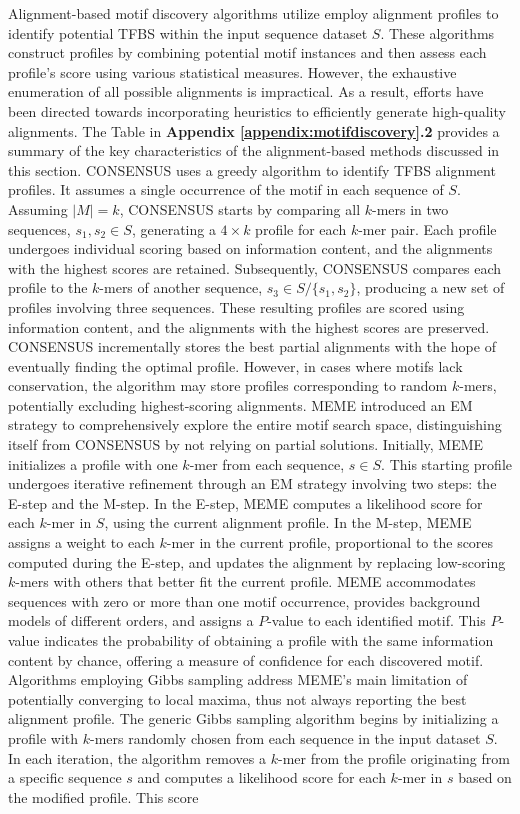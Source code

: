 \documentclass[a4paper, titlepage, openright]{book}
\begin{document}
Alignment-based motif discovery algorithms utilize employ alignment profiles to identify potential TFBS within the input sequence dataset $S$. These algorithms construct profiles by combining potential motif instances and then assess each profile's score using various statistical measures. However, the exhaustive enumeration of all possible alignments is impractical. As a result, efforts have been directed towards incorporating heuristics to efficiently generate high-quality alignments. The Table in \textbf{Appendix \ref{appendix:motifdiscovery}.2} provides a summary of the key characteristics of the alignment-based methods discussed in this section. CONSENSUS \citep{hertz1999identifying} uses a greedy algorithm to identify TFBS alignment profiles. It assumes a single occurrence of the motif in each sequence of $S$. Assuming $|M|=k$, CONSENSUS starts by comparing all $k$-mers in two sequences, $s_{1}, s_{2} \in S$, generating a $4 \times k$ profile for each $k$-mer pair. Each profile undergoes individual scoring based on information content, and the alignments with the highest scores are retained. Subsequently, CONSENSUS compares each profile to the $k$-mers of another sequence, $s_{3} \in S/\{s_{1},s_{2}\}$, producing a new set of profiles involving three sequences. These resulting profiles are scored using information content, and the alignments with the highest scores are preserved. CONSENSUS incrementally stores the best partial alignments with the hope of eventually finding the optimal profile. However, in cases where motifs lack conservation, the algorithm may store profiles corresponding to random $k$-mers, potentially excluding highest-scoring alignments. MEME \citep{bailey1994fitting,bailey1995value,bailey2006meme} introduced an EM strategy to comprehensively explore the entire motif search space, distinguishing itself from CONSENSUS by not relying on partial solutions. Initially, MEME initializes a profile with one $k$-mer from each sequence, $s \in S$. This starting profile undergoes iterative refinement through an EM strategy involving two steps: the E-step and the M-step. In the E-step, MEME computes a likelihood score for each $k$-mer in $S$, using the current alignment profile. In the M-step, MEME assigns a weight to each $k$-mer in the current profile, proportional to the scores computed during the E-step, and updates the alignment by replacing low-scoring $k$-mers with others that better fit the current profile. MEME accommodates sequences with zero or more than one motif occurrence, provides background models of different orders, and assigns a $P$-value to each identified motif. This $P$-value indicates the probability of obtaining a profile with the same information content by chance, offering a measure of confidence for each discovered motif. Algorithms employing Gibbs sampling address MEME’s main limitation of potentially converging to local maxima, thus not always reporting the best alignment profile. The generic Gibbs sampling algorithm begins by initializing a profile with $k$-mers randomly chosen from each sequence in the input dataset $S$. In each iteration, the algorithm removes a $k$-mer from the profile originating from a specific sequence $s$ and computes a likelihood score for each $k$-mer in $s$ based on the modified profile. This score 
\end{document}
